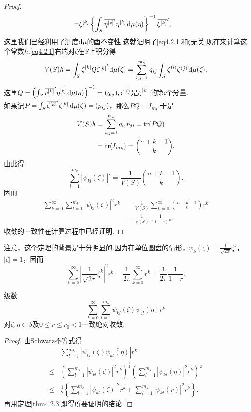 \begin{proof}
\begin{align*}
	=&\xi^{[k]}\left\{\int_S {}\mkern1mu\overline{\mkern-1mu\eta^{[k]}}'\eta^{[k]}\mathop{}\!\mathrm{d}\mu(\eta)\right\}^{-1}{}\mkern1mu\overline{\mkern-1mu\xi^{[k]}}',
\end{align*}
这里我们已经利用了测度$\mathop{}\!\mathrm{d}\mu$的酉不变性.这就证明了\eqref{eq4.2.1}和$\zeta$无关.现在来计算这个常数$h$.\eqref{eq4.2.1}右端对$\zeta$在$S$上积分得
\[V(S)h=\int_S \zeta^{[k]}Q{}\mkern1mu\overline{\mkern-1mu\zeta^{[k]}}'\mathop{}\!\mathrm{d}\mu(\zeta)=\sum_{i,j=1}^{m_k}q_{ij}\int_S \zeta^{(i)}{}\mkern1mu\overline{\mkern-1mu\zeta^{(j)}}\mathop{}\!\mathrm{d}\mu(\zeta),\]
这里$Q=\left(\int_S {}\mkern1mu\overline{\mkern-1mu\eta^{[k]}}'\eta^{[k]}\mathop{}\!\mathrm{d}\mu(\eta)\right)^{-1}=(q_{ij}),\zeta^{(i)}$是$\zeta^{[k]}$的第$i$个分量.\\
如果记$P=\int_S {}\mkern1mu\overline{\mkern-1mu\zeta^{[k]}}'\zeta^{[k]}\mathop{}\!\mathrm{d}\mu(\zeta)=(p_{ij})$，那么$PQ=I_{m_k}$.于是
\begin{align*}
	V(S)h
	&=\sum_{i,j=1}^{m_k}q_{ij}p_{ji}=\operatorname{tr}(PQ)\\
	&=\operatorname{tr}(I_{m_k})=\binom{n+k-1}{k}.
\end{align*}
由此得
\[\sum_{l=1}^{m_k}|\psi_{kl}(\zeta)|^2=\frac1{V(S)}\binom{n+k-1}{k}.\]
因而
\begin{align*}
	\sum_{k=0}^{\infty}\sum_{l=1}^{m_k}|\psi_{kl}(\zeta)|^2r^k
	&=\frac1{V(S)}\sum_{k=0}^{\infty}\binom{n+k-1}{k}r^k\\
	&=\frac1{V(S)}\frac1{(1-r)^n}.
\end{align*}
收敛的一致性在计算过程中已经证明.
\end{proof}
注意，这个定理的背景是十分明显的.因为在单位圆盘的情形，$\psi_k(\zeta)=\frac1{\sqrt{2\pi}}\zeta^k$，\\$|\zeta|=1$，因而
\[\sum_{k=0}^{\infty}\left|\frac1{\sqrt{2\pi}}\zeta^k\right|^2 r^k=\frac1{2\pi}\sum_{k=0}^{\infty}r^k=\frac1{2\pi}\frac1{1-r}.\]
\begin{theorem}\label{thm4.2.4}
	级数
	\[\sum_{k=0}^{\infty}\sum_{l=1}^{m_k}\psi_{kl}(\zeta)\bar{\psi_{kl}(\eta)}r^k\]
	对$\zeta,\eta\in S$及$0\le r\le r_0<1$一致绝对收敛.
\end{theorem}
\begin{proof}
	由Schwarz不等式得
	\begin{align*}
		&\sum_{l=1}^{m_k}\left|\psi_{kl}(\zeta)\bar{\psi_{kl}(\eta)}\right|r^k\\
		\le&\left(\sum_{l=1}^{m_k}|\psi_{kl}(\zeta)|^2r^k\right)^{\frac12}\left(\sum_{l=1}^{m_k}|\psi_{kl}(\eta)|^2r^k\right)^{\frac12}\\
		\le&\frac12\left\{\sum_{l=1}^{m_k}|\psi_{kl}(\zeta)|^2 r^k+\sum_{l=1}^{m_k}|\psi_{kl}(\eta)|^2 r^k\right\}.
	\end{align*}
再用定理\ref{thm4.2.3}即得所要证明的结论.
\end{proof}
